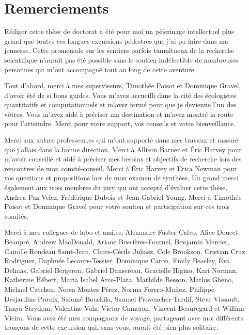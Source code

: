 \documentclass[12pt,twoside,phd]{dms}
\numberwithin{equation}{section}
\numberwithin{table}{chapter}
\numberwithin{figure}{chapter}
\begin{document}

\setlength{\parskip}{6pt} %

\chapter*{Remerciements}

Rédiger cette thèse de doctorat a été pour moi un pèlerinage intellectuel plus
grand que toutes ces longues excursions pédestres que j'ai pu faire dans ma
jeunesse. Cette promenade sur les sentiers parfois tumultueux de la recherche
scientifique n'aurait pas été possible sans le soutien indéfectible de
nombreuses personnes qui m'ont accompagné tout au long de cette aventure.

Tout d'abord, merci à mes superviseurs, Timothée Poisot et Dominique Gravel,
d'avoir été de si bons guides. Vous m'avez accueilli dans la cité des
écologistes quantitatifs et computationnels et m'avez formé pour que je devienne
l'un des vôtres. Vous m'avez aidé à préciser ma destination et m'avez montré la
route pour l'atteindre. Merci pour votre support, vos conseils et votre
bienveillance.

Merci aux autres professeur.es qui m'ont supporté dans mes travaux et rassuré
que j'allais dans la bonne direction. Merci à Allison Barner et Éric Harvey pour
m'avoir conseillé et aidé à préciser mes besoins et objectifs de recherche lors
des rencontres de mon comité-conseil. Merci à Éric Harvey et Erica Newman pour
vos questions et propositions lors de mon examen de synthèse. Un grand merci
également aux trois membres du jury qui ont accepté d'évaluer cette thèse,
Andrea Paz Velez, Frédérique Dubois et Jean-Gabriel Young. Merci à Timothée
Poisot et Dominique Gravel pour votre soutien et participation sur ces trois
comités.

Merci à mes collègues de labo et ami.es, Alexandre Fuster-Calvo, Alice Doucet
Beaupré, Andrew MacDonald, Ariane Bussières-Fournel, Benjamin Mercier, Camille
Rondeau Saint-Jean, Claire-Cécile Juhasz, Cole Brookson, Cristian Cruz
Rodriguez, Daphnée Lecours-Tessier, Dominique Caron, Emily Beasley, Eva Delmas,
Gabriel Bergeron, Gabriel Dansereau, Gracielle Higino, Kari Norman, Katherine
Hébert, Maria Isabel Arce-Plata, Mathilde Besson, Mathis Gheno, Michael Catchen,
Nerea Montes Pérez, Norma Forero-Muñoz, Philippe Desjardins-Proulx, Salomé
Bouskila, Samuel Provencher-Tardif, Steve Vissault, Tanya Strydom, Valentine
Volz, Victor Cameron, Vincent Beauregard et Willian Vieira. Vous avez été mes
compagnons de voyage, partageant avec moi différents tronçons de cette excursion
qui, sans vous, aurait été bien plus solitaire. 
\end{document}
